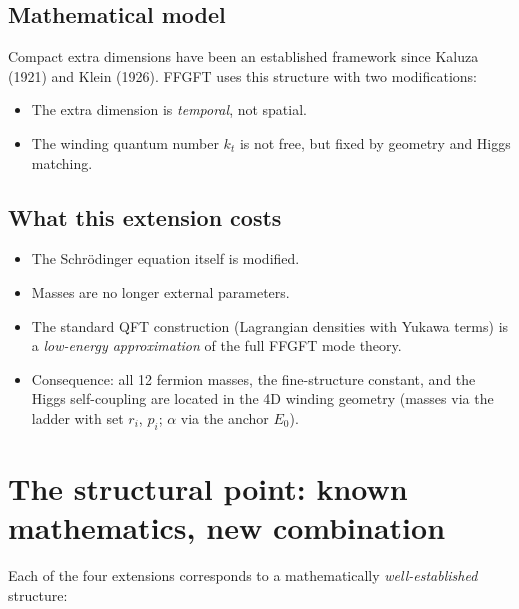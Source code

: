 \subsection{Mathematical model}

Compact extra dimensions have been an established framework since
Kaluza (1921) and Klein (1926). FFGFT uses this structure with two
modifications:
\begin{itemize}[leftmargin=2em,itemsep=2pt,topsep=2pt]
  \item The extra dimension is \emph{temporal}, not spatial.
  \item The winding quantum number $k_t$ is not free, but fixed by
        geometry and Higgs matching.
\end{itemize}

\subsection{What this extension costs}

\begin{itemize}[leftmargin=2em,itemsep=2pt,topsep=2pt]
  \item The Schrödinger equation itself is modified.
  \item Masses are no longer external parameters.
  \item The standard QFT construction (Lagrangian densities with
        Yukawa terms) is a \emph{low-energy approximation} of the
        full FFGFT mode theory.
  \item Consequence: all 12 fermion masses, the fine-structure
        constant, and the Higgs self-coupling are located in the 4D
        winding geometry (masses via the ladder with set $r_i$,
        $p_i$; $\alpha$ via the anchor $E_0$).
\end{itemize}

\section{The structural point: known mathematics, new combination}

Each of the four extensions corresponds to a mathematically
\emph{well-established} structure:

